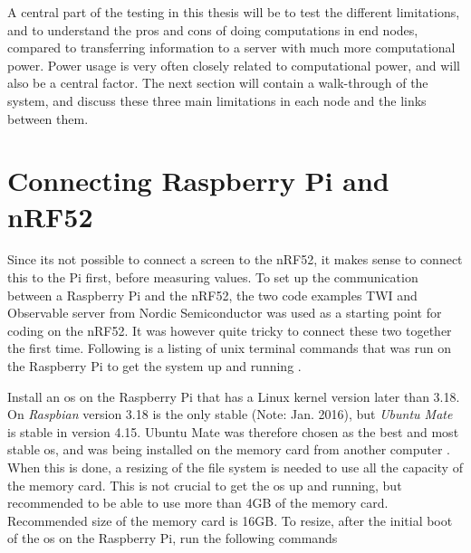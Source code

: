 

\noindent A central part of the testing in this thesis will be to test the different limitations, and to understand the pros and cons of doing computations in end nodes, compared to transferring information to a server with much more computational power. Power usage is very often closely related to computational power, and will also be a central factor. The next section will contain a walk-through of the system, and discuss these three main limitations in each node and the links between them.



\section{Connecting Raspberry Pi and nRF52}


\noindent Since its not possible to connect a screen to the \gls{nRF52}, it makes sense to connect this to the Pi first, before measuring values. To set up the communication between a \gls{Raspberry Pi} and the \gls{nRF52}, the two code examples TWI and Observable server from Nordic Semiconductor was used as a starting point for coding on the nRF52. It was however quite tricky to connect these two together the first time. Following is a listing of unix terminal commands that was run on the \gls{Raspberry Pi} to get the system up and running \cite{nordicNrfDocumentation}. 

\noindent Install an \gls{os} on the Raspberry Pi that has a Linux kernel version later than 3.18. On \textit{Raspbian} version 3.18 is the only stable (Note: Jan. 2016), but \textit{Ubuntu Mate} is stable in version 4.15. Ubuntu Mate was therefore chosen as the best and most stable \gls{os}, and was being installed on the memory card from another computer \cite{ubuntuMate}. When this is done, a resizing of the file system is needed to use all the capacity of the memory card. This is not crucial to get the \gls{os} up and running, but recommended to be able to use more than 4GB of the memory card. Recommended size of the memory card is 16GB. To resize, after the initial boot of the \gls{os} on the \gls{Raspberry Pi}, run the following commands

